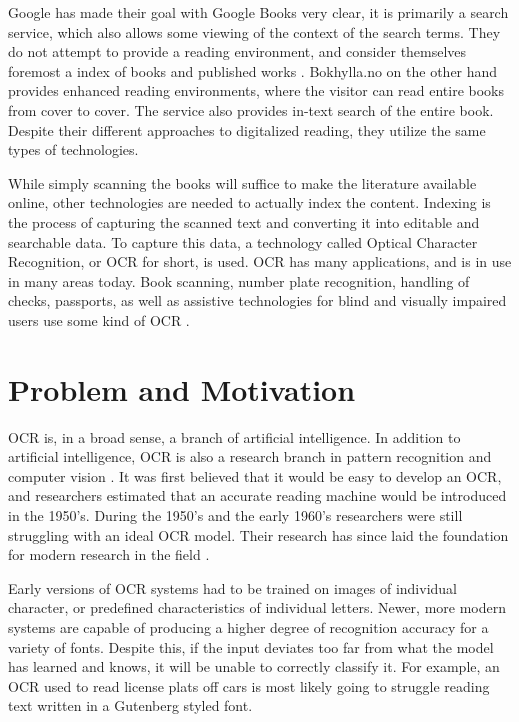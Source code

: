 Google has made their goal with Google Books very clear, it is primarily a search service, which also allows some viewing of the context of the search terms. They do not attempt to provide a reading environment, and consider themselves foremost a index of books and published works \citep{coyle2006mass}. Bokhylla.no on the other hand provides enhanced reading environments, where the visitor can read entire books from cover to cover. The service also provides in-text search of the entire book. Despite their different approaches to digitalized reading, they utilize the same types of technologies.

While simply scanning the books will suffice to make the literature available online, other technologies are needed to actually index the content. Indexing is the process of capturing the scanned text and converting it into editable and searchable data. To capture this data, a technology called Optical Character Recognition, or OCR for short, is used. OCR has many applications, and is in use in many areas today. Book scanning, number plate recognition, handling of checks, passports, as well as assistive technologies for blind and visually impaired users use some kind of OCR \citep{mori1999optical, kurzweil2000reading}.


\section{Problem and Motivation}
\label{sec:problem_motivation}
OCR is, in a broad sense, a branch of artificial intelligence. In addition to artificial intelligence, OCR is also a research branch in pattern recognition and computer vision \citep{mori1999optical}. It was first believed that it would be easy to develop an OCR, and researchers estimated that an accurate reading machine would be introduced in the 1950's. During the 1950's and the early 1960's researchers were still struggling with an ideal OCR model. Their research has since laid the foundation for modern research in the field \citep{mori1992historical}.

Early versions of OCR systems had to be trained on images of individual character, or predefined characteristics of individual letters. Newer, more modern systems are capable of producing a higher degree of recognition accuracy for a variety of fonts. Despite this, if the input deviates too far from what the model has learned and knows, it will be unable to correctly classify it. For example, an OCR used to read license plats off cars is most likely going to struggle reading text written in a Gutenberg styled font.

